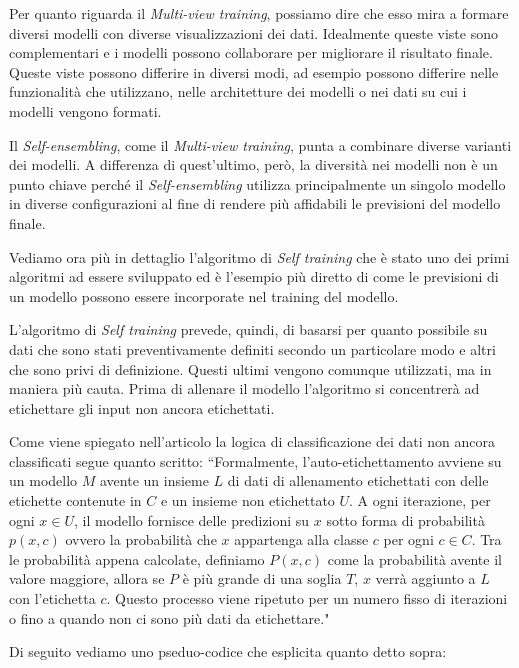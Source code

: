 \documentclass[12pt,italian]{report}
\begin{document}
Per quanto riguarda il \emph{Multi-view training}, possiamo dire che esso mira a formare diversi modelli con diverse visualizzazioni dei dati. Idealmente queste viste sono complementari e i modelli possono collaborare per migliorare il risultato finale. Queste viste possono differire in diversi modi, ad esempio possono differire nelle funzionalità che utilizzano, nelle architetture dei modelli o nei dati su cui i modelli vengono formati.

Il \emph{Self-ensembling}, come il \emph{Multi-view training}, punta a combinare diverse varianti dei modelli. A differenza di quest'ultimo, però, la diversità nei modelli non è un punto chiave perché il \emph{Self-ensembling} utilizza principalmente un singolo modello in diverse configurazioni al fine di rendere più affidabili le previsioni del modello finale. 

Vediamo ora più in dettaglio l'algoritmo di \emph{Self training} che è stato uno dei primi algoritmi ad essere sviluppato ed è l'esempio più diretto di come le previsioni di un modello possono essere incorporate nel training del modello.

L'algoritmo di \emph{Self training} prevede, quindi, di basarsi per quanto possibile su dati che sono stati preventivamente definiti secondo un particolare modo e altri che sono privi di definizione. Questi ultimi vengono comunque utilizzati, ma in maniera più cauta. Prima di allenare il modello l'algoritmo si concentrerà ad etichettare gli input non ancora etichettati.

Come viene spiegato nell'articolo \cite{ruder} %
la logica di classificazione dei dati non ancora classificati segue quanto scritto: ``Formalmente, l'auto-etichettamento avviene su un modello $ M $ avente un insieme $ L $ di dati di allenamento etichettati con delle etichette contenute in $ C $ e un insieme non etichettato $ U $. A ogni iterazione, per ogni $x \in U$, il modello fornisce delle predizioni su $ x $ sotto forma di probabilità $ p(x, c) $ ovvero la probabilità che $ x $ appartenga alla classe $ c $ per ogni $ c \in C $. Tra le probabilità appena calcolate, definiamo $ P(x, c) $ come la probabilità avente il valore maggiore, allora se $ P $ è più grande di una soglia $ T $, $ x $ verrà aggiunto a $ L $ con l'etichetta $ c $. Questo processo viene ripetuto per un numero fisso di iterazioni o fino a quando non ci sono più dati da etichettare." %

Di seguito vediamo uno pseduo-codice che esplicita quanto detto sopra:
\end{document}
